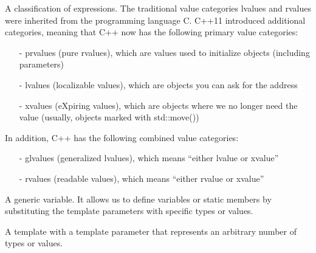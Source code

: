 


A classification of expressions. The traditional value categories lvalues and rvalues were inherited from the programming language C. C++11 introduced additional categories, meaning that C++ now has the following primary value categories:

\begin{itemize}
\item [-]
prvalues (pure rvalues), which are values used to initialize objects (including parameters)

\item [-]
lvalues (localizable values), which are objects you can ask for the address

\item [-]
xvalues (eXpiring values), which are objects where we no longer need the value (usually, objects marked with std::move())
\end{itemize}

In addition, C++ has the following combined value categories:

\begin{itemize}
\item [-]
glvalues (generalized lvalues), which means “either lvalue or xvalue”

\item [-]
rvalues (readable values), which means “either rvalue or xvalue”
\end{itemize}


A generic variable. It allows us to define variables or static members by substituting the template parameters with specific types or values.



A template with a template parameter that represents an arbitrary number of types or values.












